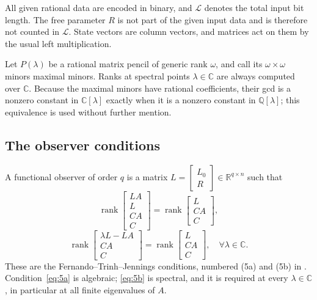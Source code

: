 \documentclass[journal]{IEEEtran}
\theoremstyle{plainn}
\theoremstyle{remark}
\begin{document}
All given rational data are encoded in binary, and $\mathcal L$ denotes the total input
bit length. The free parameter $R$ is not part of the given input data and is therefore
not counted in $\mathcal L$. State vectors are column vectors, and matrices act on them by
the usual left multiplication.

Let $P(\lambda)$ be a rational matrix pencil of generic rank $\omega$, and call its
$\omega\times\omega$ minors maximal minors. Ranks at spectral points $\lambda\in\mathbb C$
are always computed over $\mathbb C$. Because the maximal minors have rational
coefficients, their gcd is a nonzero constant in $\mathbb C[\lambda]$ exactly when it is a
nonzero constant in $\mathbb Q[\lambda]$; this equivalence is used without further
mention.

\subsection{The observer conditions}\label{sec:conditions}

A functional observer of order $q$ is a matrix $L=\begin{bmatrix}L_0 \\ R\end{bmatrix}\in\mathbb R^{q\times n}$ such
that
\begin{equation}\label{eq:5a}
\operatorname{rank}\begin{bmatrix}LA\\ L\\ CA\\ C\end{bmatrix}
=\operatorname{rank}\begin{bmatrix}L\\ CA\\ C\end{bmatrix},
\end{equation}
\begin{equation}\label{eq:5b}
\operatorname{rank}\begin{bmatrix}\lambda L-LA\\ CA\\ C\end{bmatrix}
=\operatorname{rank}\begin{bmatrix}L\\ CA\\ C\end{bmatrix},
\quad \forall\lambda\in\mathbb C.
\end{equation}
These are the Fernando--Trinh--Jennings conditions, numbered (5a) and (5b) in
\cite{fer10}. Condition~\eqref{eq:5a} is algebraic; \eqref{eq:5b} is spectral, and it is
required at every $\lambda\in\mathbb C$, in particular at all finite eigenvalues of $A$.
\end{document}
